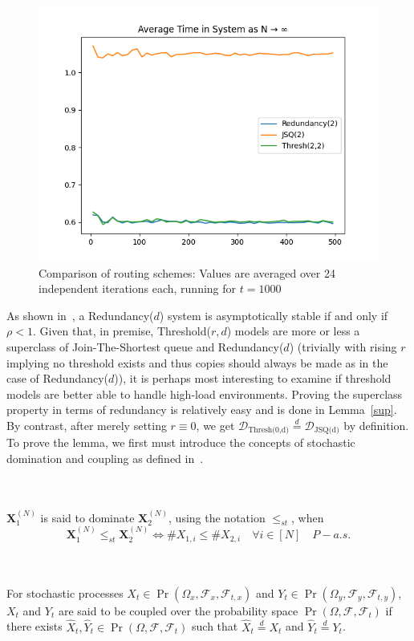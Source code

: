 \begin{figure}
    \centering
    \includegraphics[width=0.7\linewidth]{compare_red_thr}
    \caption{Comparison of routing schemes: Values are averaged over 24 independent iterations each, running for $t=1000$}
    \label{fig:img}
\end{figure}

As shown in~\cite{gardner_redundancy-d_2017}, a Redundancy($d$) system is asymptotically stable if and only if $\rho < 1 $. Given that, in premise, Threshold($r,d$) models are more or less a superclass of Join-The-Shortest queue and Redundancy($d$) (trivially with rising $r$  implying no threshold exists and thus copies should always be made as in the case of Redundancy($d$)), it is perhaps most interesting to examine if threshold models are better able to handle high-load environments. Proving the superclass property in terms of redundancy is relatively easy and is done in Lemma~\ref{sup}. By contrast, after merely setting $r \equiv 0$, we get $ \mathcal{D}_{\text{Thresh(0,d)}} \overset{d}{=} \mathcal{D}_{\text{JSQ(d)}}$ by definition.
To prove the lemma, we first must introduce the concepts of stochastic domination and coupling as defined in~\cite{bramson_asymptotic_2012}.
\begin{definition}
    \\~\\
    $\mathbf{X}_{1}^{(N)}$ is said to dominate $\mathbf{X}_{2}^{(N)}$, using the notation $\leq_{st}$, when
    \[\mathbf{X}_{1}^{(N)}\leq_{st}\mathbf{X}_{2}^{(N)} \iff\# X_{1,i} \leq \# X_{2,i}  \quad \forall i \in [N] \quad P-a.s.\]
\end{definition}

\begin{definition}
    \label{coupled}
    \\~\\
    For stochastic processes $X_{t} \in \Pr(\Omega_{x}, \mathcal{F}_{x}, \mathcal{F}_{t,x})$ and $Y_{t} \in \Pr(\Omega_{y}, \mathcal{F}_{y}, \mathcal{F}_{t,y})$,
    $X_{t}$ and $Y_{t}$ are said to be coupled over the probability space $\Pr(\Omega, \mathcal{F}, \mathcal{F}_{t})$ if there exists
    $\hat X_{t}, \hat Y_{t} \in \Pr(\Omega, \mathcal{F}, \mathcal{F}_{t})$ such that $\hat X_{t} \overset{d}{=}X_{t}$ and $\hat Y_{t} \overset{d}{=}Y_{t}$.
\end{definition}

